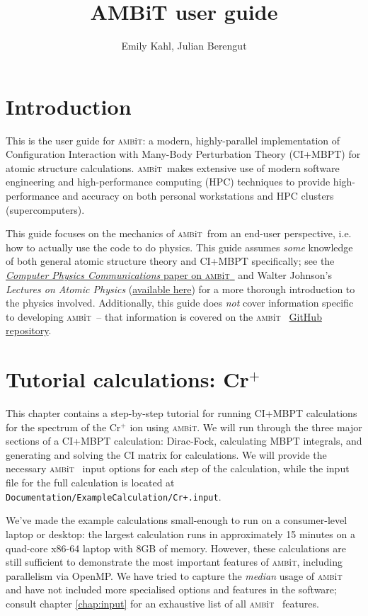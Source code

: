 \documentclass{report}
\newcommand{\ambit}{\textsc{amb}{\footnotesize i}\textsc{t}}
\begin{document}
\title{AMBiT user guide}
\author{Emily Kahl, Julian Berengut}
\date{}
\maketitle

\tableofcontents

\chapter{Introduction}
This is the user guide for \ambit: a modern, highly-parallel implementation of Configuration Interaction
with Many-Body Perturbation Theory (CI+MBPT) for atomic structure calculations. \ambit ~makes extensive 
use of modern software engineering and high-performance computing (HPC) techniques to provide 
high-performance and accuracy on both personal workstations and HPC clusters (supercomputers).

This guide focuses on the mechanics of \ambit ~from an end-user perspective, i.e. how to actually use the
code to do physics. This guide assumes \emph{some} knowledge of both general atomic structure theory and
CI+MBPT specifically; see the \href{link_goes_here}{\textit{Computer Physics Communications} paper on 
\ambit~} and Walter Johnson's \textit{Lectures on Atomic Physics} 
(\href{https://www3.nd.edu/~johnson/Publications/book.pdf}{available here}) for a more thorough 
introduction to the physics involved. Additionally, this guide does \emph{not} cover information 
specific to developing \ambit ~-- that information is covered on the \ambit~ 
\href{https://github.com/drjuls/AMBiT}{GitHub repository}.

\chapter{Tutorial calculations: Cr$^+$}

This chapter contains a step-by-step tutorial for running CI+MBPT calculations for the spectrum of the
Cr$^+$ ion using \ambit. We will run through the three major sections of a CI+MBPT calculation:
Dirac-Fock, calculating MBPT integrals, and generating and solving the CI matrix for calculations. We
will provide the necessary \ambit~ input options for each step of the calculation, while the input file
for the full calculation is located at \texttt{Documentation/ExampleCalculation/Cr+.input}.

We've made the example calculations small-enough to run on a consumer-level laptop or desktop: the
largest calculation runs in approximately 15 minutes on a quad-core x86-64 laptop with 8GB of
memory. However, these calculations are still sufficient to demonstrate the most important features of 
\ambit, including parallelism via OpenMP. We have tried to capture the \textit{median} usage of \ambit~
and have not included more specialised options and features in the software; consult chapter
\ref{chap:input} for an exhaustive list of all \ambit~ features.
\end{document}
